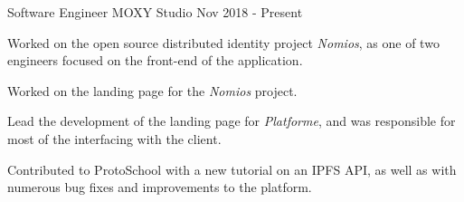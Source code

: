 

\begin{cventries}

  \cventry
    {Software Engineer} %
    {MOXY Studio} %
    {} %
    {Nov 2018 - Present} %
    {
      \begin{cvitems} %
        \item {Worked on the open source distributed identity project \textit{Nomios}, as one of two engineers focused on the front-end of the application.}
        \item {Worked on the landing page for the \textit{Nomios} project.}
        \item {Lead the development of the landing page for \textit{Platforme}, and was responsible for most of the interfacing with the client.}
         \item {Contributed to ProtoSchool with a new tutorial on an IPFS API, as well as with numerous bug fixes and improvements to the platform.}
      \end{cvitems}
    }


\end{cventries}
